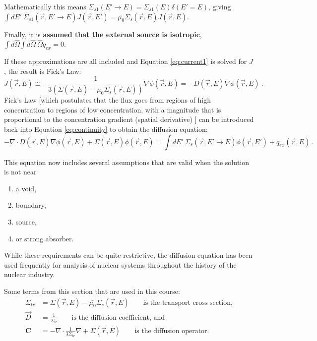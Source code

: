 \documentclass[12pt]{article}
\newcommand{\ve}[1]{\ensuremath{\mathbf{#1}}}
\newcommand{\Macro}{\ensuremath{\Sigma}}
\newcommand{\vOmega}{\ensuremath{\hat{\Omega}}}
\begin{document}
 Mathematically this means $\Macro_{s1}(E' \to E) = \Macro_{s1}(E) \delta(E' = E)$, giving $\int dE' \:\Macro_{s1}(\vec{r}, E' \to E)J(\vec{r},E') = \bar{\mu_{0}}\Macro_{s}(\vec{r},E)J(\vec{r},E)$. 
 
Finally, it is \textbf{assumed that the external source is isotropic}, $\int  d\vOmega \int d\vOmega \:\vOmega q_{ex} = 0$.

If these approximations are all included and Equation \eqref{eq:current1} is solved for $J$, the result is Fick's Law:
%
\begin{equation}
  J(\vec{r},E) \cong -\frac{1}{3(\Macro(\vec{r},E) - \bar{\mu_{0}}\Macro_{s}(\vec{r},E))} \nabla \phi (\vec{r},E) = -D(\vec{r},E) \nabla \phi (\vec{r},E) \:.
\end{equation}
%
Fick's Law [which postulates that the flux goes from regions of high concentration to regions of low concentration, with a magnitude that is proportional to the concentration gradient (spatial derivative) ] can be introduced back into Equation \eqref{eq:continuity} to obtain the diffusion equation:
%
\begin{equation}
  -\nabla \cdot D(\vec{r},E) \nabla \phi(\vec{r},E) + \Macro(\vec{r},E)\phi(\vec{r},E) = \int dE' \:\Macro_{s}(\vec{r}, E' \to E)\phi(\vec{r},E') + q_{ex}(\vec{r},E) \:.
  \label{eq:diffusion}
\end{equation}

This equation now includes several assumptions that are valid when the solution is not near
%
\begin{enumerate}
\item  a void, 
\item boundary, 
\item source, 
\item or strong absorber.
\end{enumerate} 
%
While these requirements can be quite restrictive, the diffusion equation has been used frequently for analysis of nuclear systems throughout the history of the nuclear industry.

Some terms from this section that are used in this course:
\begin{align}
  \Macro_{tr} &= \Macro(\vec{r},E) - \bar{\mu_{0}}\Macro_{s}(\vec{r},E) \qquad \text{is the transport cross section,}\\
  \vec{D} &= \frac{1}{\Macro_{tr}} \qquad \text{is the diffusion coefficient, and}\\
  \ve{C} &= -\nabla \cdot \frac{1}{3\Macro_{tr}}\nabla+ \Macro(\vec{r},E) \qquad \text{is the diffusion operator.}
\end{align}
\end{document}
